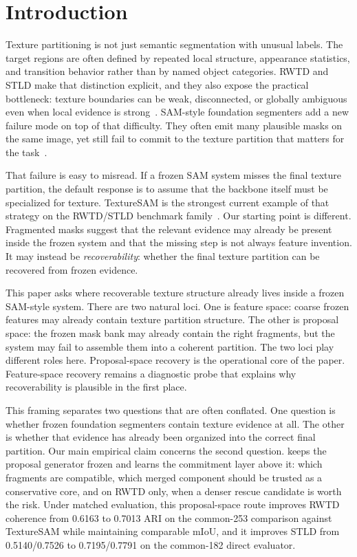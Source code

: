 \section{Introduction}
\label{sec:intro}

Texture partitioning is not just semantic segmentation with unusual labels. The target regions are often defined by repeated local structure, appearance statistics, and transition behavior rather than by named object categories. RWTD and STLD make that distinction explicit, and they also expose the practical bottleneck: texture boundaries can be weak, disconnected, or globally ambiguous even when local evidence is strong~\cite{khan2015stld,khan2017c2f,khan2018learnedstld,mikes2022texturebenchmark}. SAM-style foundation segmenters add a new failure mode on top of that difficulty. They often emit many plausible masks on the same image, yet still fail to commit to the texture partition that matters for the task~\cite{kirillov2023sam,ravi2024sam2}.

That failure is easy to misread. If a frozen SAM system misses the final texture partition, the default response is to assume that the backbone itself must be specialized for texture. TextureSAM is the strongest current example of that strategy on the RWTD/STLD benchmark family~\cite{cohen2025texturesam,cohen2026texturesam}. Our starting point is different. Fragmented masks suggest that the relevant evidence may already be present inside the frozen system and that the missing step is not always feature invention. It may instead be \emph{recoverability}: whether the final texture partition can be recovered from frozen evidence.

This paper asks where recoverable texture structure already lives inside a frozen SAM-style system. There are two natural loci. One is feature space: coarse frozen features may already contain texture partition structure. The other is proposal space: the frozen mask bank may already contain the right fragments, but the system may fail to assemble them into a coherent partition. The two loci play different roles here. Proposal-space recovery is the operational core of the paper. Feature-space recovery remains a diagnostic probe that explains why recoverability is plausible in the first place.



This framing separates two questions that are often conflated. One question is whether frozen foundation segmenters contain texture evidence at all. The other is whether that evidence has already been organized into the correct final partition. Our main empirical claim concerns the second question. \sys{} keeps the proposal generator frozen and learns the commitment layer above it: which fragments are compatible, which merged component should be trusted as a conservative core, and on RWTD only, when a denser rescue candidate is worth the risk. Under matched evaluation, this proposal-space route improves RWTD coherence from 0.6163 to 0.7013 ARI on the common-253 comparison against TextureSAM while maintaining comparable mIoU, and it improves STLD from 0.5140/0.7526 to 0.7195/0.7791 on the common-182 direct evaluator.


